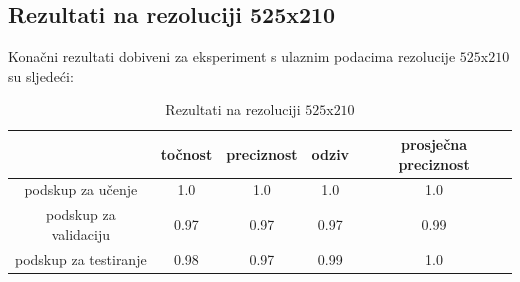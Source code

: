 \documentclass[times, utf8, diplomski, numeric]{fer}
\begin{document}
\subsection{Rezultati na rezoluciji 525x210}
Konačni rezultati dobiveni za eksperiment s ulaznim podacima rezolucije $525$x$210$ su sljedeći:
\begin{table}[H]
\centering
\caption{Rezultati na rezoluciji $525$x$210$}
\label{score:single_hand_525x210}
\begin{tabular}{c|c|c|c|c|}
\cline{2-5}
                                            & točnost & preciznost & odziv & prosječna preciznost \\ \hline
\multicolumn{1}{|c|}{podskup za učenje}     & 1.0       & 1.0        & 1.0     &           1.0           \\ \hline
\multicolumn{1}{|c|}{podskup za validaciju} & 0.97       & 0.97        & 0.97     &            0.99          \\ \hline
\multicolumn{1}{|c|}{podskup za testiranje} & 0.98       & 0.97        & 0.99     &            1.0          \\ \hline
\end{tabular}
\end{table}
\end{document}
